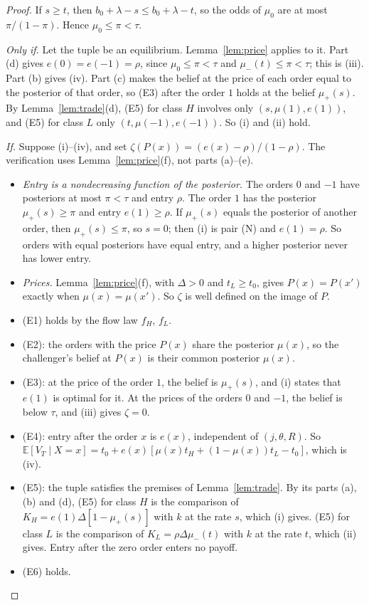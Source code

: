 \documentclass[11pt]{article}
\theoremstyle{definition}
\newcommand{\E}{\mathbb E}
\begin{document}
\begin{proof}
If $s\ge t$, then $b_0+\lambda-s\le b_0+\lambda-t$, so the odds of $\mu_0$ are at most $\pi/(1-\pi)$. Hence
$\mu_0\le\pi<\tau$.

\emph{Only if.} Let the tuple be an equilibrium. Lemma~\ref{lem:price} applies to it. Part (d) gives
$e(0)=e(-1)=\rho$, since $\mu_0\le\pi<\tau$ and $\mu_-(t)\le\pi<\tau$; this is (iii). Part (b) gives (iv). Part (c)
makes the belief at the price of each order equal to the posterior of that order, so (E3) after the order $1$ holds
at the belief $\mu_+(s)$. By Lemma~\ref{lem:trade}(d), (E5) for class $H$ involves only $(s,\mu(1),e(1))$, and (E5)
for class $L$ only $(t,\mu(-1),e(-1))$. So (i) and (ii) hold.

\emph{If.} Suppose (i)--(iv), and set $\zeta(P(x))=(e(x)-\rho)/(1-\rho)$. The verification uses
Lemma~\ref{lem:price}(f), not parts (a)--(e).
\begin{itemize}
\item \emph{Entry is a nondecreasing function of the posterior.} The orders $0$ and $-1$ have posteriors at most
  $\pi<\tau$ and entry $\rho$. The order $1$ has the posterior $\mu_+(s)\ge\pi$ and entry $e(1)\ge\rho$. If
  $\mu_+(s)$ equals the posterior of another order, then $\mu_+(s)\le\pi$, so $s=0$; then (i) is pair (N) and
  $e(1)=\rho$. So orders with equal posteriors have equal entry, and a higher posterior never has lower entry.
\item \emph{Prices.} Lemma~\ref{lem:price}(f), with $\Delta>0$ and $t_L\ge t_0$, gives $P(x)=P(x')$ exactly when
  $\mu(x)=\mu(x')$. So $\zeta$ is well defined on the image of $P$.
\item (E1) holds by the flow law $f_H$, $f_L$.
\item (E2): the orders with the price $P(x)$ share the posterior $\mu(x)$, so the challenger's belief at $P(x)$ is
  their common posterior $\mu(x)$.
\item (E3): at the price of the order $1$, the belief is $\mu_+(s)$, and (i) states that $e(1)$ is optimal for it.
  At the prices of the orders $0$ and $-1$, the belief is below $\tau$, and (iii) gives $\zeta=0$.
\item (E4): entry after the order $x$ is $e(x)$, independent of $(j,\theta,R)$. So
  $\E[V_T\mid X=x]=t_0+e(x)[\mu(x)t_H+(1-\mu(x))t_L-t_0]$, which is (iv).
\item (E5): the tuple satisfies the premises of Lemma~\ref{lem:trade}. By its parts (a), (b) and (d), (E5) for class
  $H$ is the comparison of $K_H=e(1)\Delta[1-\mu_+(s)]$ with $k$ at the rate $s$, which (i) gives. (E5) for class
  $L$ is the comparison of $K_L=\rho\Delta\mu_-(t)$ with $k$ at the rate $t$, which (ii) gives. Entry after the zero
  order enters no payoff.
\item (E6) holds.\qedhere
\end{itemize}
\end{proof}
\end{document}
